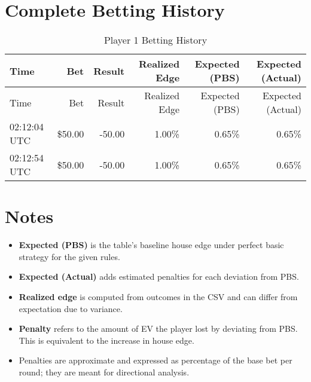 \documentclass[11pt]{article}
\begin{document}
\section*{Complete Betting History}
\begin{longtable}{l | r | r | r | r | r}
\caption{Player 1 Betting History}\label{tab:history_p1}\\
\hline
Time & Bet & Result & Realized Edge & Expected (PBS) & Expected (Actual) \\ \hline
\endfirsthead
\hline
Time & Bet & Result & Realized Edge & Expected (PBS) & Expected (Actual) \\ \hline
\endhead
02:12:04 UTC & \$50.00 & -50.00 & 1.00\% & 0.65\% & 0.65\% \\
02:12:54 UTC & \$50.00 & -50.00 & 1.00\% & 0.65\% & 0.65\% \\
\hline
\end{longtable}

\section*{Notes}
\begin{itemize}
  \item \textbf{Expected (PBS)} is the table’s baseline house edge under perfect basic strategy for the given rules.
  \item \textbf{Expected (Actual)} adds estimated penalties for each deviation from PBS.
  \item \textbf{Realized edge} is computed from outcomes in the CSV and can differ from expectation due to variance.
  \item \textbf{Penalty} refers to the amount of EV the player lost by deviating from PBS. This is equivalent to the increase in house edge.
  \item Penalties are approximate and expressed as percentage of the base bet per round; they are meant for directional analysis.
\end{itemize}
\end{document}
